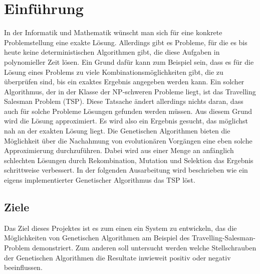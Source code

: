 
\section{Einführung}
In der Informatik und Mathematik wünscht man sich für eine konkrete Problemstellung eine exakte Lösung. Allerdings gibt es Probleme, für die es bis heute keine deterministischen Algorithmen gibt, die diese Aufgaben in polynomieller Zeit lösen. 
Ein Grund dafür kann zum Beispiel sein, dass es für die Lösung eines Problems zu viele Kombinationsmöglichkeiten gibt, die zu überprüfen sind, bis ein exaktes Ergebnis angegeben werden kann. Ein solcher Algorithmus, der in der Klasse der NP-schweren Probleme liegt, ist das Travelling Salesman Problem (TSP).
Diese Tatsache ändert allerdings nichts daran, dass auch für solche Probleme Lösungen gefunden werden müssen. Aus diesem Grund wird die Lösung approximiert. Es wird also ein Ergebnis gesucht, das möglichst nah an der exakten Lösung liegt. 
Die Genetischen Algorithmen bieten die Möglichkeit über die Nachahmung von evolutionären Vorgängen eine eben solche Approximierung durchzuführen.
Dabei wird aus einer Menge an anfänglich schlechten Lösungen durch Rekombination, Mutation und Selektion das Ergebnis schrittweise verbessert. In der folgenden Ausarbeitung wird beschrieben wie ein eigens implementierter Genetischer Algorithmus das TSP löst.

\subsection{Ziele}
Das Ziel dieses Projektes ist es zum einen ein System zu entwickeln, das die Möglichkeiten von Genetischen Algorithmen am Beispiel des Travelling-Salesman-Problem demonstriert.
Zum anderen soll untersucht werden welche Stellschrauben der Genetischen Algorithmen die Resultate inwieweit positiv oder negativ beeinflussen.

